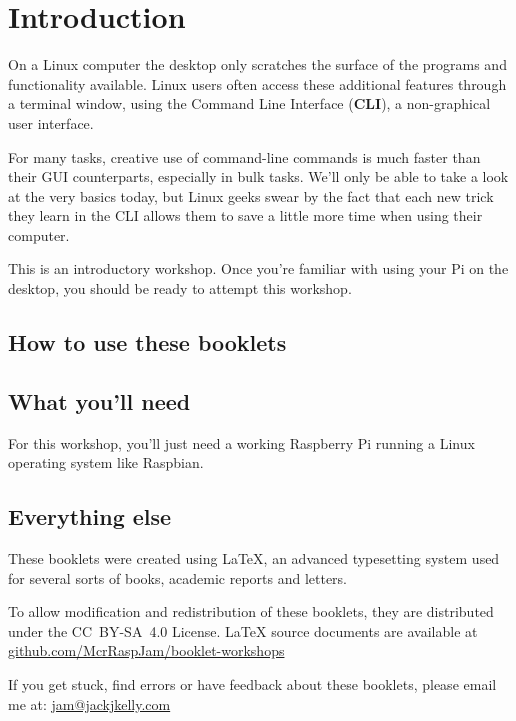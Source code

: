 \setcounter{section}{-1}
\section{Introduction}
	
	On a Linux computer the desktop only scratches the surface of the programs and functionality available. Linux users often access these additional features through a terminal window, using the Command Line Interface (\textbf{CLI}), a non-graphical user interface.
	
	For many tasks, creative use of command-line commands is much faster than their GUI counterparts, especially in bulk tasks.	We'll only be able to take a look at the very basics today, but Linux geeks swear by the fact that each new trick they learn in the CLI allows them to save a little more time when using their computer.

	This is an introductory workshop. Once you're familiar with using your Pi on the desktop, you should be ready to attempt this workshop.
		
	\subsection*{How to use these booklets}

		
		
		
		
		
	
	\subsection*{What you'll need}
		
		For this workshop, you'll just need a working Raspberry Pi running a Linux operating system like Raspbian.
		
	\subsection*{Everything else}
		
		\ifprint\else These booklets were created using {\selectfont \LaTeX}, an advanced typesetting system used for several sorts of books, academic reports and letters. \fi
		
		To allow modification and redistribution of these booklets, they are distributed under the \hbox{CC BY-SA 4.0} License. LaTeX source documents are available at \mbox{\href{http://github.com/McrRaspJam/booklet-workshops}{github.com/McrRaspJam/booklet-workshops}}
		
		If you get stuck, find errors or have feedback about these booklets, please email me at:
		\mbox{\url{jam@jackjkelly.com}\label{email}}